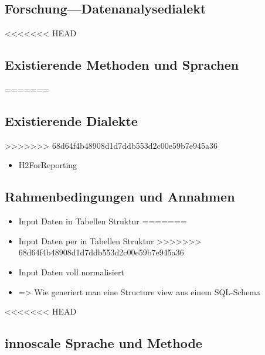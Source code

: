 \documentclass[
  language=german, %
  type=bachelor%
]{isthesis}
\begin{document}
\begin{content}
% 



  



  \chapter{Forschung---Datenanalysedialekt}
<<<<<<< HEAD
  \section{Existierende Methoden und Sprachen}
=======
  \section{Existierende Dialekte}
>>>>>>> 68d64f4b48908d1d7ddb553d2c00e59b7e945a36
  \begin{itemize}
    \item H2ForReporting
  \end{itemize}

  \section{Rahmenbedingungen und Annahmen}
  \begin{itemize}
<<<<<<< HEAD
    \item Input Daten in Tabellen Struktur
=======
    \item Input Daten per in Tabellen Struktur
>>>>>>> 68d64f4b48908d1d7ddb553d2c00e59b7e945a36
    \item Input Daten voll normalisiert
    \item => Wie generiert man eine Structure view aus einem SQL-Schema
  \end{itemize}

<<<<<<< HEAD
  \section{innoscale Sprache und Methode}


\end{content}
\end{document}
